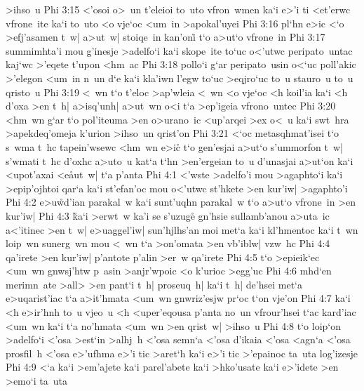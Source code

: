 >ihso~u\bibvsend
\vs Phi 3:15
<'osoi
o>~un
t'eleioi
to~uto
vfron~wmen
ka`i
e>'i
ti
<et'erwc
vfrone~ite
ka`i
to~uto
<o
vje`oc
<um~in
>apokal'uyei\bibvsend
\vs Phi 3:16
pl`hn
e>ic
<`o
>efj'asamen
t~w|
a>ut~w|
stoiqe~in
kan'oni\r{}
t`o
a>ut`o
vfrone~in\bibvsend
\vs Phi 3:17
summimhta'i
mou
g'inesje
>adelfo`i
ka`i
skope~ite
to`uc
o<'utwc
peripato~untac
kaj`wc
>'eqete
t'upon
<hm~ac\bibvsend
\vs Phi 3:18
pollo`i
g`ar
peripato~usin
o<`uc
poll'akic
>'elegon
<um~in
n~un
d`e
ka`i
kla'iwn
l'egw
to`uc
>eqjro`uc
to~u
stauro~u
to~u
qristo~u\bibvsend
\vs Phi 3:19
<~wn
t`o
t'eloc
>ap'wleia
<~wn
<o
vje`oc
<h
koil'ia
ka`i
<h
d'oxa
>en
t~h|
a>isq'unh|
a>ut~wn
o<i
t`a
>ep'igeia
vfrono~untec\bibvsend
\vs Phi 3:20
<hm~wn
g`ar
t`o
pol'iteuma
>en
o>urano~ic
<up'arqei
>ex
o<~u
ka`i
swt~hra
>apekdeq'omeja
k'urion
>ihso~un
qrist'on\bibvsend
\vs Phi 3:21
<`oc
metasqhmat'isei
t`o
s~wma
t~hc
tapein'wsewc
<hm~wn
e>ic\r{}
t`o
gen'esjai
a>ut`o
s'ummorfon
t~w|
s'wmati
t~hc
d'oxhc
a>uto~u
kat`a
t`hn
>en'ergeian
to~u
d'unasjai
a>ut`on
ka`i
<upot'axai
<e\r{a}ut~w|
t`a
p'anta\bibvsend
\vs Phi 4:1
<'wste
>adelfo'i
mou
>agaphto`i
ka`i
>epip'ojhtoi
qar`a
ka`i
st'efan'oc
mou
o<'utwc
st'hkete
>en
kur'iw|
>agaphto'i\bibvsend
\vs Phi 4:2
e>u\r{w}d'ian
parakal~w
ka`i
sunt'uqhn
parakal~w
t`o
a>ut`o
vfrone~in
>en
kur'iw|\bibvsend
\vs Phi 4:3
\r{k}a`i
>erwt~w
ka'i
se
s'uzuge\r{}
gn'hsie
sullamb'anou
a>uta~ic
a<'itinec
>en
t~w|
e>uaggel'iw|
sun'hjlhs'an
moi
met`a
ka`i
kl'hmentoc
ka`i
t~wn
loip~wn
sunerg~wn
mou
<~wn
t`a
>on'omata
>en
vb'iblw|
vzw~hc\bibvsend
\vs Phi 4:4
qa'irete
>en
kur'iw|
p'antote
p'alin
>er~w
qa'irete\bibvsend
\vs Phi 4:5
t`o
>epieik`ec
<um~wn
gnwsj'htw
p~asin
>anjr'wpoic
<o
k'urioc
>egg'uc\bibvsend
\vs Phi 4:6
mhd`en
merimn~ate
>all>
>en
pant`i
t~h|
proseuq~h|
ka`i
t~h|
de'hsei
met`a
e>uqarist'iac
t`a
a>it'hmata
<um~wn
gnwriz'esjw
pr`oc
t`on
vje'on\bibvsend
\vs Phi 4:7
ka`i
<h
e>ir'hnh
to~u
vjeo~u
<h
<uper'eqousa
p'anta
no~un
vfrour'hsei
t`ac
kard'iac
<um~wn
ka`i
t`a
no'hmata
<um~wn
>en
qrist~w|
>ihso~u\bibvsend
\vs Phi 4:8
t`o
loip`on
>adelfo`i
<'osa
>est`in
>alhj~h
<'osa
semn`a
<'osa
d'ikaia
<'osa
<agn`a
<'osa
prosfil~h
<'osa
e>'ufhma
e>'i
tic
>aret`h
ka`i
e>'i
tic
>'epainoc
ta~uta
log'izesje\bibvsend
\vs Phi 4:9
<`a
ka`i
>em'ajete
ka`i
parel'abete
ka`i
>hko'usate
ka`i
e>'idete
>en
>emo`i
ta~uta
